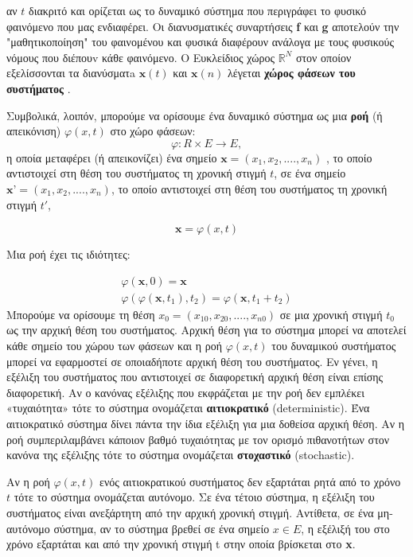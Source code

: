 αν $t$ διακριτό και ορίζεται ως το δυναμικό σύστημα που περιγράφει το φυσικό φαινόμενο που μας ενδιαφέρει. Οι διανυσματικές συναρτήσεις \textbf{f} και \textbf{g} αποτελούν την "μαθητικοποίηση"
του φαινομένου και φυσικά διαφέρουν ανάλογα με τους φυσικούς νόμους που διέπουv κάθε φαινόμενο. Ο Ευκλείδιος χώρος $ \mathbb{R} ^Ν$ στον οποίον εξελίσσονται τα διανύσματa $\textbf{x}(t)$ και $\textbf{x}(n)$ λέγεται \textbf{χώρος φάσεων του συστήματος} \cite{b1}.

\newpage

Συμβολικά, λοιπόν, μπορούμε να ορίσουμε ένα δυναμικό σύστημα ως μια \textbf{ροή} (ή απεικόνιση)  $φ(x,t)$  στο χώρο φάσεων:
\begin{equation}
	φ: R\times E \to E ,
\end{equation}
η οποία μεταφέρει (ή απεικονίζει) ένα σημείο $\textbf{x}=(x_1,x_2,....,x_n)$ , το οποίο αντιστοιχεί στη θέση του
συστήματος τη χρονική στιγμή $t$, σε ένα
σημείο $\textbf{x'}=(x_1,x_2,....,x_n)$, το οποίο αντιστοιχεί στη θέση του συστήματος τη χρονική στιγμή $t'$,

\begin{equation}
	\textbf{x}=φ(x,t)
\end{equation}

Μια ροή έχει τις ιδιότητες:

\begin{gather}
	φ(\textbf{x},0)=\textbf{x} \\
	φ(φ(\textbf{x},t_1),t_2)=φ(\textbf{x},t_1+t_2)
\end{gather}
Μπορούμε να ορίσουμε τη θέση $x_0 = (x_{10}, x_{20},...., x_{n0})$ σε μια χρονική στιγμή $t_0$ ως την αρχική θέση του
συστήματος. Αρχική θέση για το σύστημα μπορεί να αποτελεί κάθε σημείο του χώρου των φάσεων και η ροή $φ(x,t)$ του δυναμικού συστήματος μπορεί να εφαρμοστεί σε οποιαδήποτε αρχική θέση του συστήματος. Εν γένει, η εξέλιξη του συστήματος που αντιστοιχεί σε διαφορετική αρχική θέση είναι επίσης διαφορετική. Αν ο κανόνας εξέλιξης που εκφράζεται με την ροή δεν εμπλέκει «τυχαιότητα» τότε το σύστημα ονομάζεται \textbf{αιτιοκρατικό} (deterministic). Ένα αιτιοκρατικό σύστημα δίνει πάντα την ίδια εξέλιξη για μια δοθείσα αρχική θέση. Αν η ροή συμπεριλαμβάνει κάποιον βαθμό τυχαιότητας με τον ορισμό πιθανοτήτων στον κανόνα της εξέλιξης τότε το σύστημα ονομάζεται \textbf{στοχαστικό} (stochastic). 

Αν η ροή $φ(x,t)$ ενός αιτιοκρατικού συστήματος δεν εξαρτάται ρητά από το χρόνο $t$ τότε το σύστημα ονομάζεται αυτόνομο. Σε ένα τέτοιο σύστημα, η εξέλιξη του συστήματος είναι ανεξάρτητη από την αρχική
χρονική στιγμή. Αντίθετα, σε ένα μη-αυτόνομο σύστημα, αν το σύστημα βρεθεί σε ένα σημείο $x \in E$, η εξέλιξή του στο χρόνο εξαρτάται και από την χρονική στιγμή t στην οποία βρίσκεται στο \textbf{x}.

